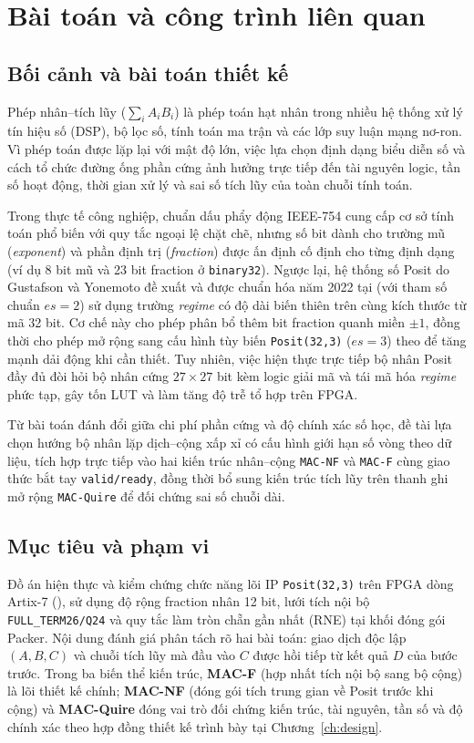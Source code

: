 \chapter{Bài toán và công trình liên quan}
\label{ch:problem}

\section{Bối cảnh và bài toán thiết kế}
Phép nhân--tích lũy ($\sum_i A_i B_i$) là phép toán hạt nhân trong nhiều hệ thống
xử lý tín hiệu số (DSP), bộ lọc số, tính toán ma trận và các lớp suy luận
mạng nơ-ron. Vì phép toán được lặp lại với mật độ lớn, việc lựa chọn định dạng
biểu diễn số và cách tổ chức đường ống phần cứng ảnh hưởng trực tiếp đến tài nguyên
logic, tần số hoạt động, thời gian xử lý và sai số tích lũy của toàn chuỗi tính toán.

Trong thực tế công nghiệp, chuẩn dấu phẩy động IEEE-754 \cite{ieee754_2019} cung
cấp cơ sở tính toán phổ biến với quy tắc ngoại lệ chặt chẽ, nhưng số bit dành cho
trường mũ (\textit{exponent}) và phần định trị (\textit{fraction}) được ấn định cố
định cho từng định dạng (ví dụ 8 bit mũ và 23 bit fraction ở \texttt{binary32}).
Ngược lại, hệ thống số Posit do Gustafson và Yonemoto đề xuất \cite{gustafson2017posit}
và được chuẩn hóa năm 2022 tại \cite{positstandard2022} (với tham số chuẩn $es=2$)
sử dụng trường \textit{regime} có độ dài biến thiên trên cùng kích thước từ mã
32 bit. Cơ chế này cho phép phân bổ thêm bit fraction quanh miền $\pm 1$, đồng
thời cho phép mở rộng sang cấu hình tùy biến \texttt{Posit(32,3)} ($es=3$) theo
\cite{norris2021iterativeposit} để tăng mạnh dải động khi cần thiết. Tuy nhiên,
việc hiện thực trực tiếp bộ nhân Posit đầy đủ đòi hỏi bộ nhân cứng $27\times 27$ bit
kèm logic giải mã và tái mã hóa \textit{regime} phức tạp, gây tốn LUT và làm tăng
độ trễ tổ hợp trên FPGA.

Từ bài toán đánh đổi giữa chi phí phần cứng và độ chính xác số học, đề tài lựa
chọn hướng bộ nhân lặp dịch--cộng xấp xỉ có cấu hình giới hạn số vòng theo dữ liệu,
tích hợp trực tiếp vào hai kiến trúc nhân--cộng \texttt{MAC-NF} và \texttt{MAC-F}
cùng giao thức bắt tay \texttt{valid/ready}, đồng thời bổ sung kiến trúc tích lũy
trên thanh ghi mở rộng \texttt{MAC-Quire} để đối chứng sai số chuỗi dài.

\section{Mục tiêu và phạm vi}
Đồ án hiện thực và kiểm chứng chức năng lõi IP \texttt{Posit(32,3)} trên FPGA dòng
Artix-7 (), sử dụng độ rộng fraction nhân 12 bit, lưới tích
nội bộ \texttt{FULL\_TERM26/Q24} và quy tắc làm tròn chẵn gần nhất (RNE) tại khối
đóng gói Packer. Nội dung đánh giá phân tách rõ hai bài toán: giao dịch độc lập
$(A,B,C)$ và chuỗi tích lũy mà đầu vào $C$ được hồi tiếp từ kết quả $D$ của bước
trước. Trong ba biến thể kiến trúc, \textbf{MAC-F} (hợp nhất tích nội bộ sang bộ
cộng) là lõi thiết kế chính; \textbf{MAC-NF} (đóng gói tích trung gian về Posit
trước khi cộng) và \textbf{MAC-Quire} đóng vai trò đối chứng kiến trúc, tài nguyên,
tần số và độ chính xác theo hợp đồng thiết kế trình bày tại Chương~\ref{ch:design}.

